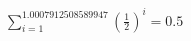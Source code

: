 \documentclass[preview]{standalone}
\begin{document}
\begin{align*}
\sum_{i=1}^{1.0007912508589947} (\frac{1}{2})^i = {0.5}
\end{align*}
\end{document}
